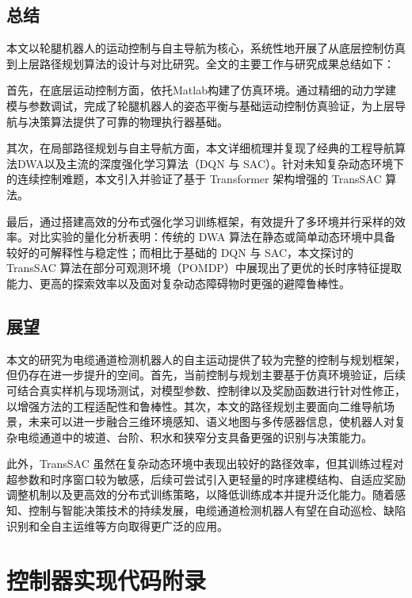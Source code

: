 \documentclass[
  oneside,
  degree=bachelor,
  fullwidthstop=false,
  fontset=fandol,
  times=false,
  minted=true,
  biblatex=true,
]{tongjithesis}
\begin{document}
\section{总结}
本文以轮腿机器人的运动控制与自主导航为核心，系统性地开展了从底层控制仿真到上层路径规划算法的设计与对比研究。全文的主要工作与研究成果总结如下：

首先，在底层运动控制方面，依托Matlab构建了仿真环境。通过精细的动力学建模与参数调试，完成了轮腿机器人的姿态平衡与基础运动控制仿真验证，为上层导航与决策算法提供了可靠的物理执行器基础。

其次，在局部路径规划与自主导航方面，本文详细梳理并复现了经典的工程导航算法DWA以及主流的深度强化学习算法（DQN 与 SAC）。针对未知复杂动态环境下的连续控制难题，本文引入并验证了基于 Transformer 架构增强的 TransSAC 算法。

最后，通过搭建高效的分布式强化学习训练框架，有效提升了多环境并行采样的效率。对比实验的量化分析表明：传统的 DWA 算法在静态或简单动态环境中具备较好的可解释性与稳定性；而相比于基础的 DQN 与 SAC，本文探讨的 TransSAC 算法在部分可观测环境（POMDP）中展现出了更优的长时序特征提取能力、更高的探索效率以及面对复杂动态障碍物时更强的避障鲁棒性。
\section{展望}
本文的研究为电缆通道检测机器人的自主运动提供了较为完整的控制与规划框架，但仍存在进一步提升的空间。首先，当前控制与规划主要基于仿真环境验证，后续可结合真实样机与现场测试，对模型参数、控制律以及奖励函数进行针对性修正，以增强方法的工程适配性和鲁棒性。其次，本文的路径规划主要面向二维导航场景，未来可以进一步融合三维环境感知、语义地图与多传感器信息，使机器人对复杂电缆通道中的坡道、台阶、积水和狭窄分支具备更强的识别与决策能力。

此外，TransSAC 虽然在复杂动态环境中表现出较好的路径效率，但其训练过程对超参数和时序窗口较为敏感，后续可尝试引入更轻量的时序建模结构、自适应奖励调整机制以及更高效的分布式训练策略，以降低训练成本并提升泛化能力。随着感知、控制与智能决策技术的持续发展，电缆通道检测机器人有望在自动巡检、缺陷识别和全自主运维等方向取得更广泛的应用。
% 
% 
% 
% 
% 
% 
% 
\makereferences

\appendix
\chapter{控制器实现代码附录}\label{chap:control-code}
\end{document}
